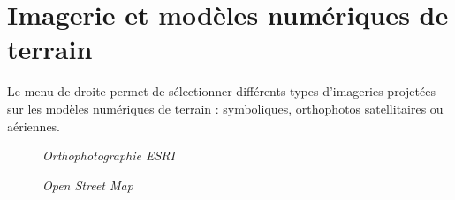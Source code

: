 \chapter{Imagerie et modèles numériques de terrain}
Le menu de droite permet de sélectionner différents types d'imageries projetées sur les modèles numériques de terrain : symboliques, orthophotos satellitaires ou aériennes.
\begin{center}
\begin{figure}[ht]
\caption{\label{equiProj}\textit{Orthophotographie ESRI}}
\end{figure}
\end{center}
\begin{center}
\begin{figure}[ht]
\caption{\label{equiProj}\textit{Open Street Map}}
\end{figure}
\end{center}

